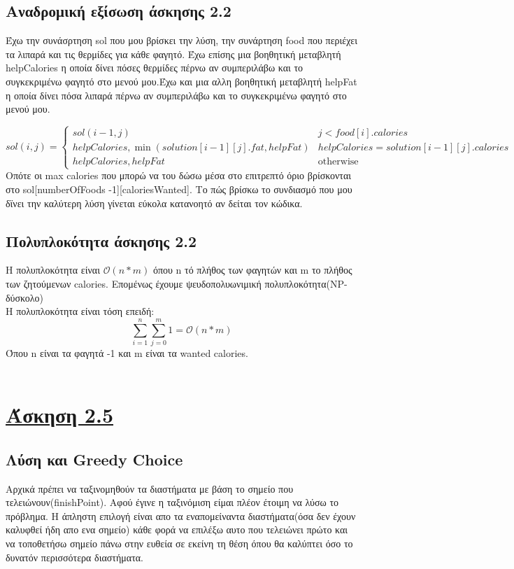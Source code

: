 \documentclass[12pt]{article}
\begin{document}
\subsection{Αναδρομική εξίσωση άσκησης 2.2}
Έχω την συνάσρτηση sol που μου βρίσκει την λύση, την συνάρτηση food που περιέχει τα λιπαρά και τις θερμίδες για κάθε φαγητό. Έχω επίσης μια βοηθητική μεταβλητή helpCalories η οποία δίνει πόσες θερμίδες πέρνω αν συμπεριλάβω και  το συγκεκριμένω φαγητό στο μενού μου.Έχω και μια αλλη βοηθητική μεταβλητή helpFat η οποία δίνει πόσα λιπαρά πέρνω αν συμπεριλάβω και  το συγκεκριμένω φαγητό στο μενού μου.

\begin{equation*}
sol(i,j) = \begin{cases}
sol(i-1,j)     & j< food[i].calories\\
helpCalories,\min{(solution[i-1][j].fat, helpFat )}  & helpCalories = solution[i-1][j].calories\\
helpCalories, helpFat   & \text{otherwise}
\end{cases}
\end{equation*}
Οπότε οι max calories που μπορώ να του δώσω μέσα στο επιτρεπτό όριο βρίσκονται στο sol[numberOfFoods -1][caloriesWanted]. Το πώς βρίσκω το συνδιασμό που μου δϊνει την καλύτερη λύση γίνεται εύκολα κατανοητό αν δείται τον κώδικα.


\subsection{Πολυπλοκότητα άσκησης 2.2}
Η πολυπλοκότητα είναι $\mathcal{O}(n*m)$ όπου n τό πλήθος των φαγητών  και m το πλήθος των ζητούμενων calories. Επομένως έχουμε ψευδοπολυωνιμική πολυπλοκότητα(NP-δύσκολο)\\
Η πολυπλοκότητα είναι τόση επειδή:
$$\sum_{i=1}^{n}\sum_{j=0}^{m} 1 = \mathcal{O}(n*m)$$
Όπου n είναι τα φαγητά -1 και m είναι τα wanted calories.\\\\

\section{\underline{Άσκηση 2.5}}
\subsection{Λύση και Greedy Choice}
Αρχικά πρέπει να ταξινομηθούν τα διαστήματα με βάση το σημείο που τελειώνουν(finishPoint).
Αφού έγινε η ταξινόμιση είμαι πλέον έτοιμη να λύσω το πρόβλημα. Η άπληστη επιλογή είναι απο τα εναπομείναντα διαστήματα(όσα δεν έχουν καλυφθεί ήδη απο ενα σημείο) κάθε φορά να επιλέξω αυτο που τελειώνει πρώτο και  να τοποθετήσω σημείο πάνω στην ευθεία σε εκείνη τη θέση όπου θα καλύπτει όσο το δυνατόν περισσότερα διαστήματα.\\
\end{document}
